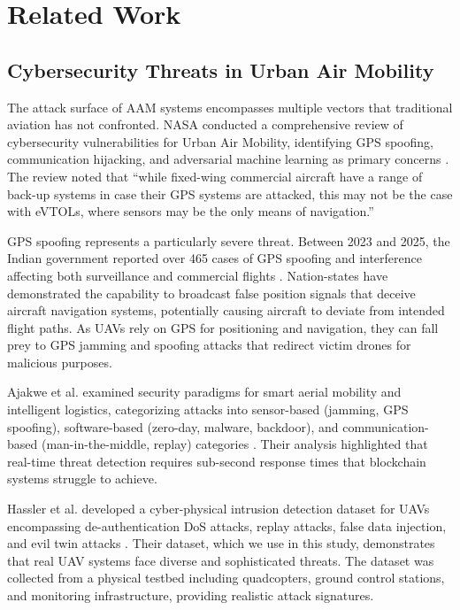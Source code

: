 \documentclass[conference]{IEEEtran}
\begin{document}
\section{Related Work}
\label{sec:related}

\subsection{Cybersecurity Threats in Urban Air Mobility}

The attack surface of AAM systems encompasses multiple vectors that traditional aviation has not confronted. NASA conducted a comprehensive review of cybersecurity vulnerabilities for Urban Air Mobility, identifying GPS spoofing, communication hijacking, and adversarial machine learning as primary concerns \cite{nasa2020}. The review noted that ``while fixed-wing commercial aircraft have a range of back-up systems in case their GPS systems are attacked, this may not be the case with eVTOLs, where sensors may be the only means of navigation.''

GPS spoofing represents a particularly severe threat. Between 2023 and 2025, the Indian government reported over 465 cases of GPS spoofing and interference affecting both surveillance and commercial flights \cite{verticalmag2024}. Nation-states have demonstrated the capability to broadcast false position signals that deceive aircraft navigation systems, potentially causing aircraft to deviate from intended flight paths. As UAVs rely on GPS for positioning and navigation, they can fall prey to GPS jamming and spoofing attacks that redirect victim drones for malicious purposes.

Ajakwe et al. examined security paradigms for smart aerial mobility and intelligent logistics, categorizing attacks into sensor-based (jamming, GPS spoofing), software-based (zero-day, malware, backdoor), and communication-based (man-in-the-middle, replay) categories \cite{ajakwe2024}. Their analysis highlighted that real-time threat detection requires sub-second response times that blockchain systems struggle to achieve.

Hassler et al. developed a cyber-physical intrusion detection dataset for UAVs encompassing de-authentication DoS attacks, replay attacks, false data injection, and evil twin attacks \cite{hassler2023}. Their dataset, which we use in this study, demonstrates that real UAV systems face diverse and sophisticated threats. The dataset was collected from a physical testbed including quadcopters, ground control stations, and monitoring infrastructure, providing realistic attack signatures.
\end{document}
